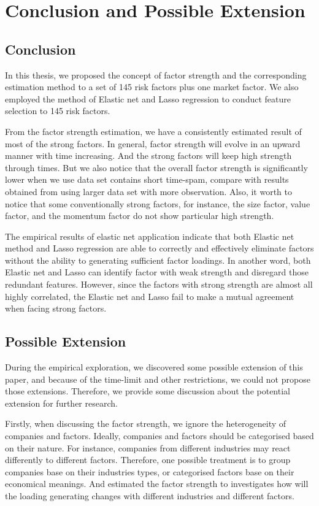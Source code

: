 	\chapter{Conclusion and Possible Extension}\label{Conclusion}
		\section{Conclusion}
In this thesis, we proposed the concept of factor strength and the corresponding estimation method to a set of 145 risk factors plus one market factor.
We also employed the method of Elastic net and Lasso regression to conduct feature selection to 145 risk factors.

From the factor strength estimation, we have a consistently estimated result of most of the strong factors.
In general, factor strength will evolve in an upward manner with time increasing.
And the strong factors will keep high strength through times.
But we also notice that the overall factor strength is significantly lower when we use data set contains short time-spam, compare with results obtained from using larger data set with more observation.
Also, it worth to notice that some conventionally strong factors, for instance, the size factor, value factor, and the momentum factor do not show particular high strength.

The empirical results of elastic net application indicate that both Elastic net method and Lasso regression are able to correctly and effectively eliminate factors without the ability to generating sufficient factor loadings.
In another word, both Elastic net and Lasso can identify factor with weak strength and disregard those redundant features.
However, since the factors with strong strength are almost all highly correlated, the Elastic net and Lasso fail to make a mutual agreement when facing strong factors.

\section{Possible Extension}
During the empirical exploration, we discovered some possible extension of this paper, and because of the time-limit and other restrictions, we could not propose those extensions.
Therefore, we provide some discussion about the potential extension for further research.

Firstly, when discussing the factor strength, we ignore the heterogeneity of companies and factors.
Ideally, companies and factors should be categorised based on their nature.
For instance, companies from different industries may react differently to different factors.
Therefore, one possible treatment is to group companies base on their industries types, or categorised factors base on their economical meanings.
And estimated the factor strength to investigates how will the loading generating changes with different industries and different factors.

